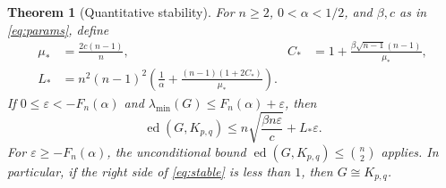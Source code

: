 \documentclass[11pt]{amsart}
\newtheorem{theorem}{Theorem}[section]
\theoremstyle{definition}
\newcommand{\lam}{\lambda_{\min}}
\newcommand{\ee}{\operatorname{ed}}
\begin{document}
\begin{theorem}[Quantitative stability]\label{thm:stability}
For $n\ge2$, $0<\alpha<1/2$, and $\beta,c$ as in \eqref{eq:params}, define
\begin{align}\label{eq:constants}
 \mu_*&=\frac{2c(n-1)}{n},&
 C_*&=1+\frac{\beta\sqrt{n-1}(n-1)}{\mu_*},\\
 L_*&=n^2(n-1)^2\left(\frac1\alpha+
 \frac{(n-1)(1+2C_*)}{\mu_*}\right).\nonumber
\end{align}
If $0\le\varepsilon<-F_n(\alpha)$ and
$\lam(G)\le F_n(\alpha)+\varepsilon$, then
\begin{equation}\label{eq:stable}
 \ee(G,K_{p,q})\le
 n\sqrt{\frac{\beta n\varepsilon}{c}}+L_*\varepsilon.
\end{equation}
For $\varepsilon\ge-F_n(\alpha)$, the unconditional bound $\ee(G,K_{p,q})\le\binom n2$ applies. In particular, if the right side of \eqref{eq:stable} is less than $1$, then $G\cong K_{p,q}$.
\end{theorem}
\end{document}
